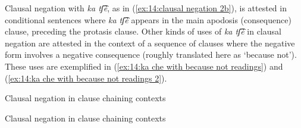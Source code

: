 Clausal negation with \textit{ka tʃ͡è}, as in (\ref{ex:14:clausal negation 2b}), is attested in conditional sentences where \textit{ka tʃ͡è} appears in the main apodosis (consequence) clause, preceding the protasis clause. Other kinds of uses of \textit{ka tʃ͡è} in clausal negation are attested in the context of a sequence of clauses where the negative form involves a negative consequence (roughly translated here as `because not'). These uses are exemplified in (\ref{ex:14:ka che with because not readings}) and (\ref{ex:14:ka che with because not readings 2}).

\ea\label{ex:14:ka che with because not readings}
{Clausal negation in clause chaining contexts}

\newpage
    \z
\z

\ea\label{ex:14:ka che with because not readings 2}
{Clausal negation in clause chaining contexts}

